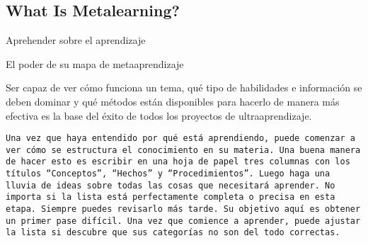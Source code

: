 \subsection{What Is Metalearning?}

Aprehender sobre el aprendizaje

El poder de su mapa de metaaprendizaje

Ser capaz de ver c\'omo funciona un tema, qu\'e tipo de habilidades e informaci\'on se deben dominar y qu\'e m\'etodos est\'an disponibles para hacerlo de manera m\'as efectiva es la base del \'exito de todos los proyectos de ultraaprendizaje.

\begin{verbatim}
Una vez que haya entendido por qué está aprendiendo, puede comenzar a ver cómo se estructura el conocimiento en su materia. Una buena manera de hacer esto es escribir en una hoja de papel tres columnas con los títulos “Conceptos”, “Hechos” y “Procedimientos”. Luego haga una lluvia de ideas sobre todas las cosas que necesitará aprender. No importa si la lista está perfectamente completa o precisa en esta etapa. Siempre puedes revisarlo más tarde. Su objetivo aquí es obtener un primer pase difícil. Una vez que comience a aprender, puede ajustar la lista si descubre que sus categorías no son del todo correctas.
\end{verbatim}

